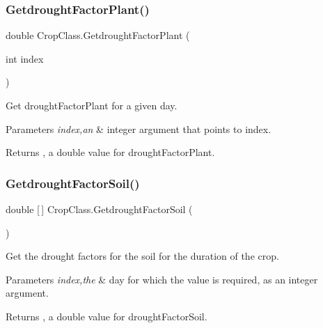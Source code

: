 \subsubsection{\texorpdfstring{GetdroughtFactorPlant()}{GetdroughtFactorPlant()}}
{\footnotesize\ttfamily double Crop\+Class.\+Getdrought\+Factor\+Plant (\begin{DoxyParamCaption}\item[{int}]{index }\end{DoxyParamCaption})\hspace{0.3cm}{\ttfamily [inline]}}



Get drought\+Factor\+Plant for a given day. 


\begin{DoxyParams}{Parameters}
{\em index,an} & integer argument that points to index. \\
\hline
\end{DoxyParams}
\begin{DoxyReturn}{Returns}
, a double value for drought\+Factor\+Plant. 
\end{DoxyReturn}
\mbox{\label{class_crop_class_aedfde0a699a41708e663c9d2e6606106}} 
\subsubsection{\texorpdfstring{GetdroughtFactorSoil()}{GetdroughtFactorSoil()}\hspace{0.1cm}{\footnotesize\ttfamily [1/2]}}
{\footnotesize\ttfamily double \mbox{[}$\,$\mbox{]} Crop\+Class.\+Getdrought\+Factor\+Soil (\begin{DoxyParamCaption}{ }\end{DoxyParamCaption})\hspace{0.3cm}{\ttfamily [inline]}}



Get the drought factors for the soil for the duration of the crop. 


\begin{DoxyParams}{Parameters}
{\em index,the} & day for which the value is required, as an integer argument. \\
\hline
\end{DoxyParams}
\begin{DoxyReturn}{Returns}
, a double value for drought\+Factor\+Soil. 
\end{DoxyReturn}
\mbox{\label{class_crop_class_a29f806e9033e77e5e9b640bc5313278e}} 
